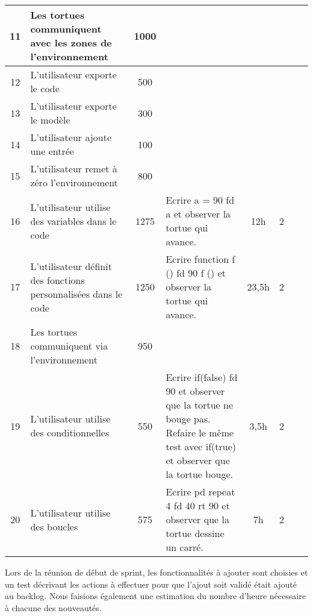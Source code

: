 {\begin{longtable}[c]{|c|p{2cm}|c|p{4cm}|*{4}{c|}}
\hline
11 & Les tortues communiquent avec les zones de l'environnement & 1000 &  &  &  &  &  \\
\hline
12 & L'utilisateur exporte le code & 500 &  &  &  &  &  \\
\hline
13 & L'utilisateur exporte le modèle & 300 &  &  &  &  &  \\
\hline
14 & L'utilisateur ajoute une entrée & 100 &  &  &  &  &  \\
\hline
15 & L'utilisateur remet à zéro l'environnement & 800 &  &  &  &  &  \\
\hline
16 & L'utilisateur utilise des variables dans le code & 1275 & Ecrire a = 90 fd a et observer la tortue qui avance. & 12h & 2 &  &  \\
\hline
17 & L'utilisateur définit des fonctions personnalisées dans le code & 1250 & Ecrire function f () { fd 90 } f () et observer la tortue qui avance. & 23,5h & 2 & &  \\
\hline
18 & Les tortues communiquent via l'environnement & 950 &  &  &  &  &  \\
\hline
19 & L'utilisateur utilise des conditionnelles & 550 & Ecrire if(false) { fd 90 } et observer que la tortue ne bouge pas. Refaire le même test avec if(true) et observer que la tortue bouge. & 3,5h & 2 &  &  \\
\hline
20 & L'utilisateur utilise des boucles & 575 & Ecrire pd repeat 4 { fd 40 rt 90 } et observer que la tortue dessine un carré. & 7h & 2 &  &  \\
\hline
\end{longtable}}

Lors de la réunion de début de sprint, les fonctionnalités à ajouter sont choisies et un test décrivant les actions à effectuer pour que l'ajout soit validé était ajouté au backlog. Nous faisions également une estimation du nombre d'heure nécessaire à chacune des nouveautés.
